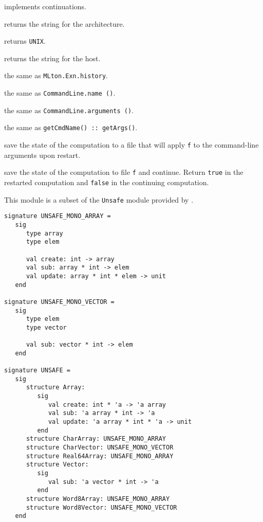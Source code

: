 \begin{description}

 implements continuations.

returns the string for the architecture.

returns {\tt UNIX}.

returns the string for the host.

the same as {\tt MLton.Exn.history}.

the same as {\tt CommandLine.name ()}.

the same as {\tt CommandLine.arguments ()}.

the same as {\tt getCmdName() :: getArgs()}.

save the state of the computation to a file that will apply {\tt f} to
the command-line arguments upon restart.

save the state of the computation to file {\tt f} and continue.
Return {\tt true} in the restarted computation and {\tt false} in the
continuing computation.

\end{description}
%

This module is a subset of the {\tt Unsafe} module provided by
{\smlnj}.

\begin{verbatim}
signature UNSAFE_MONO_ARRAY =
   sig
      type array
      type elem

      val create: int -> array
      val sub: array * int -> elem
      val update: array * int * elem -> unit
   end

signature UNSAFE_MONO_VECTOR =
   sig
      type elem
      type vector

      val sub: vector * int -> elem
   end

signature UNSAFE =
   sig
      structure Array:
         sig
            val create: int * 'a -> 'a array
            val sub: 'a array * int -> 'a
            val update: 'a array * int * 'a -> unit
         end
      structure CharArray: UNSAFE_MONO_ARRAY
      structure CharVector: UNSAFE_MONO_VECTOR
      structure Real64Array: UNSAFE_MONO_ARRAY
      structure Vector:
         sig
            val sub: 'a vector * int -> 'a
         end
      structure Word8Array: UNSAFE_MONO_ARRAY
      structure Word8Vector: UNSAFE_MONO_VECTOR
   end
\end{verbatim}
